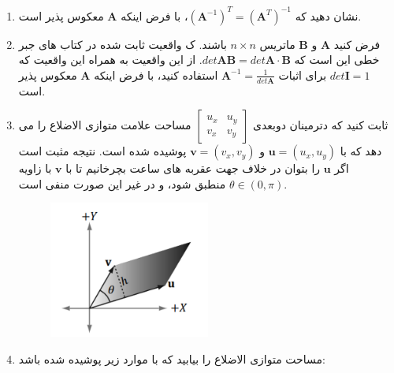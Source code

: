 {\begin{spacing}{1.5}
\begin{enumerate}[label=\textbf{\arabic*}.]
            \item {نشان دهید که $(\textbf{A}^{-1})^{T}=(\textbf{A}^{T})^{-1}$، با فرض اینکه $\textbf{A}$ معکوس پذیر است.}

            \item {فرض کنید $\textbf{A}$ و $\textbf{B}$ ماتریس $n\times n$ باشند.
            ک واقعیت ثابت شده در کتاب های جبر خطی این است که $det\textbf{AB}=det\textbf{A}\cdot\textbf{B}$.
            از این واقعیت به همراه این واقعیت که $det\textbf{I}=1$ برای اثبات $\textbf{A}^{-1}=\frac{\displaystyle 1}{\displaystyle det\textbf{A}}$ استفاده کنید،
            با فرض اینکه $\textbf{A}$ معکوس پذیر است.}

            \item {ثابت کنید که دترمینان دوبعدی  $\begin{bmatrix}
                                                      u_{x} & u_{y} \\
                                                      v_{x} & v_{y}
            \end{bmatrix}$ مساحت علامت متوازی الاضلاع را می دهد که با $\textbf{u}=(u_{x},u_{y})$ و $\textbf{v}=(v_{x},v_{y})$ پوشیده شده است.
            نتیجه مثبت است اگر $\textbf{u}$ را بتوان در خلاف جهت عقربه های ساعت بچرخانیم تا با $\textbf{v}$ با زاویه $\theta\in(0,\pi)$ منطبق شود، و در غیر این صورت منفی است.
                \begin{figure}[H]
                    \centering
                    \setlength{\belowcaptionskip}{-10pt}
                    \includegraphics[width=0.5\textwidth]{Images/4/2/4.Session.1.2.2}
                    \label{fig:4.Session.1.2.2}
                \end{figure}
            }

            \item {مساحت متوازی الاضلاع را بیابید که با موارد زیر پوشیده شده باشد: \\
            }


\end{enumerate}
\end{spacing}}
